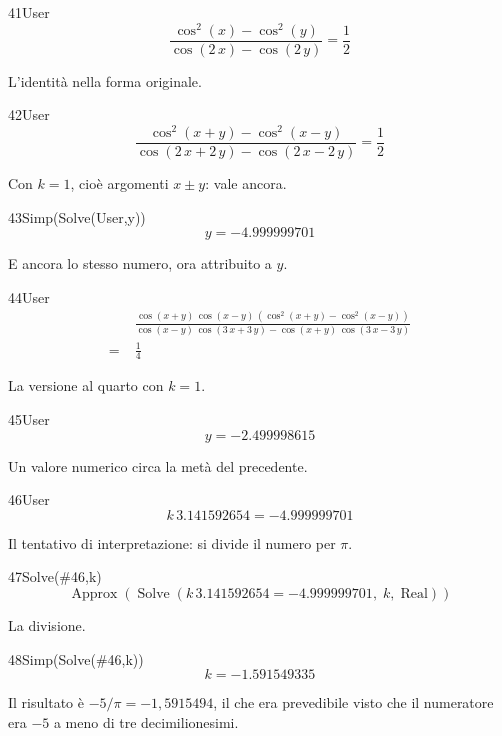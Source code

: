 \begin{espr}{41}{User}{\verificata}
\[
\frac{\cos^{2}\!\left(x\right) - \cos^{2}\!\left(y\right)}{\cos\!\left(2\, x\right) - \cos\!\left(2\, y\right)} = \frac{1}{2}
\]
\end{espr}
L'identità nella forma originale.

\begin{espr}{42}{User}{\verificata}
\[
\frac{\cos^{2}\!\left(x + y\right) - \cos^{2}\!\left(x - y\right)}{\cos\!\left(2\, x + 2\, y\right) - \cos\!\left(2\, x - 2\, y\right)} = \frac{1}{2}
\]
\end{espr}
Con $k=1$, cioè argomenti $x\pm y$: vale ancora.

\begin{espr}{43}{Simp(Solve(User,y))}{}
\[
y = -4.999999701
\]
\end{espr}
E ancora lo stesso numero, ora attribuito a $y$.

\begin{espr}{44}{User}{\verificata}
\begin{align*}
& \frac{\cos\!\left(x + y\right)\, \cos\!\left(x - y\right)\, \left(\cos^{2}\!\left(x + y\right) - \cos^{2}\!\left(x - y\right)\right)}{\cos\!\left(x - y\right)\, \cos\!\left(3\, x + 3\, y\right) - \cos\!\left(x + y\right)\, \cos\!\left(3\, x - 3\, y\right)} \\
=\;& \frac{1}{4}
\end{align*}
\end{espr}
La versione al quarto con $k=1$.

\begin{espr}{45}{User}{}
\[
y = -2.499998615
\]
\end{espr}
Un valore numerico circa la metà del precedente.

\begin{espr}{46}{User}{}
\[
k\, 3.141592654 = -4.999999701
\]
\end{espr}
Il tentativo di interpretazione: si divide il numero per $\pi$.

\begin{espr}{47}{Solve(\#46,k)}{}
\[
\operatorname{Approx}\!\left(\operatorname{Solve}\!\left(k\, 3.141592654 = -4.999999701,\; k,\; \mathrm{Real}\right)\right)
\]
\end{espr}
La divisione.

\begin{espr}{48}{Simp(Solve(\#46,k))}{}
\[
k = -1.591549335
\]
\end{espr}
Il risultato è $-5/\pi=-1{,}5915494$, il che era prevedibile visto che il numeratore era $-5$ a meno di tre decimilionesimi.


